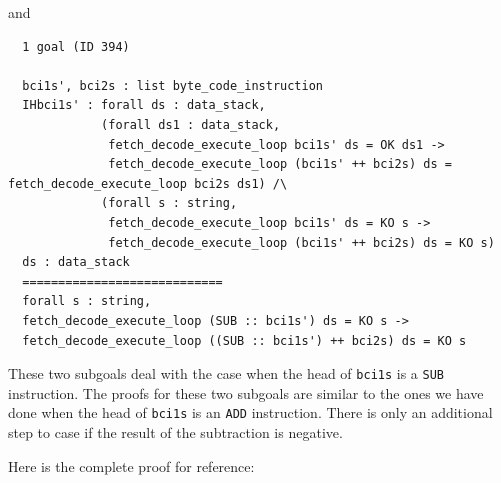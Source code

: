 \documentclass{article}
\begin{document}
and 

\begin{lstlisting}
  1 goal (ID 394)
  
  bci1s', bci2s : list byte_code_instruction
  IHbci1s' : forall ds : data_stack,
             (forall ds1 : data_stack,
              fetch_decode_execute_loop bci1s' ds = OK ds1 ->
              fetch_decode_execute_loop (bci1s' ++ bci2s) ds = fetch_decode_execute_loop bci2s ds1) /\
             (forall s : string,
              fetch_decode_execute_loop bci1s' ds = KO s ->
              fetch_decode_execute_loop (bci1s' ++ bci2s) ds = KO s)
  ds : data_stack
  ============================
  forall s : string,
  fetch_decode_execute_loop (SUB :: bci1s') ds = KO s ->
  fetch_decode_execute_loop ((SUB :: bci1s') ++ bci2s) ds = KO s
\end{lstlisting}

These two subgoals deal with the case when the head of \texttt{bci1s} is a \texttt{SUB} instruction. The proofs for these two subgoals are similar to the ones we have done when the head of \texttt{bci1s} is an \texttt{ADD} instruction. There is only an additional step to case if the result of the subtraction is negative.

Here is the complete proof for reference:
\end{document}
